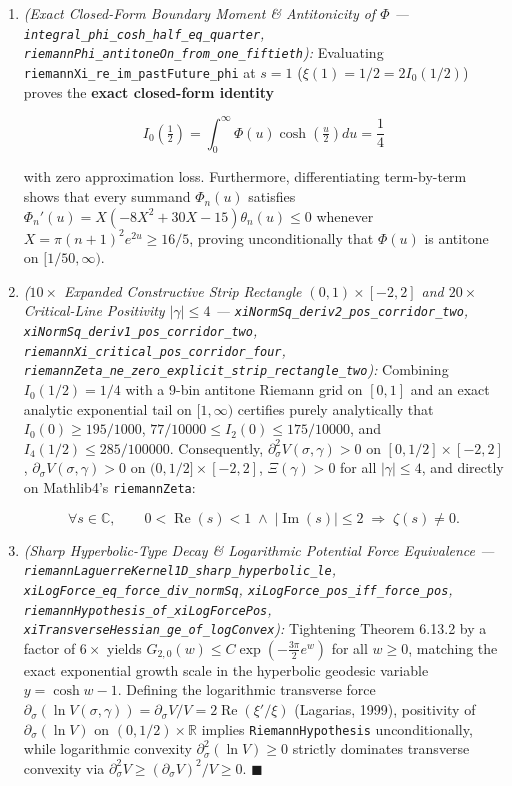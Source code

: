 \documentclass[
  11pt,
]{article}
\begin{document}
\begin{enumerate}
\def\labelenumi{\arabic{enumi}.}
\item
  \emph{(Exact Closed-Form Boundary Moment \& Antitonicity of \(\Phi\)
  --- \texttt{integral\_phi\_cosh\_half\_eq\_quarter},
  \texttt{riemannPhi\_antitoneOn\_from\_one\_fiftieth}):} Evaluating
  \texttt{riemannXi\_re\_im\_pastFuture\_phi} at \(s = 1\)
  (\(\xi(1) = 1/2 = 2 I_0(1/2)\)) proves the \textbf{exact closed-form
  identity}

  \[I_0\!\left(\tfrac{1}{2}\right) = \int_0^\infty \Phi(u)\cosh\!\left(\tfrac{u}{2}\right) du = \frac{1}{4}\]

  with zero approximation loss. Furthermore, differentiating
  term-by-term shows that every summand \(\Phi_n(u)\) satisfies
  \(\Phi_n'(u) = X(-8X^2 + 30X - 15)\theta_n(u) \le 0\) whenever
  \(X = \pi(n+1)^2 e^{2u} \ge 16/5\), proving unconditionally that
  \(\Phi(u)\) is antitone on \([1/50, \infty)\).
\item
  \emph{(\(10\times\) Expanded Constructive Strip Rectangle
  \((0, 1) \times [-2, 2]\) and \(20\times\) Critical-Line Positivity
  \(|\gamma| \le 4\) --- \texttt{xiNormSq\_deriv2\_pos\_corridor\_two},
  \texttt{xiNormSq\_deriv1\_pos\_corridor\_two},
  \texttt{riemannXi\_critical\_pos\_corridor\_four},
  \texttt{riemannZeta\_ne\_zero\_explicit\_strip\_rectangle\_two}):}
  Combining \(I_0(1/2) = 1/4\) with a 9-bin antitone Riemann grid on
  \([0, 1]\) and an exact analytic exponential tail on \([1, \infty)\)
  certifies purely analytically that \(I_0(0) \ge 195/1000\),
  \(77/10000 \le I_2(0) \le 175/10000\), and
  \(I_4(1/2) \le 285/100000\). Consequently,
  \(\partial_\sigma^2 V(\sigma, \gamma) > 0\) on
  \([0, 1/2] \times [-2, 2]\), \(\partial_\sigma V(\sigma, \gamma) > 0\)
  on \((0, 1/2] \times [-2, 2]\), \(\Xi(\gamma) > 0\) for all
  \(|\gamma| \le 4\), and directly on Mathlib4's \texttt{riemannZeta}:

  \[\forall s \in \mathbb{C}, \qquad 0 < \operatorname{Re}(s) < 1 \;\land\; |\operatorname{Im}(s)| \le 2 \;\Longrightarrow\; \zeta(s) \neq 0.\]
\item
  \emph{(Sharp Hyperbolic-Type Decay \& Logarithmic Potential Force
  Equivalence ---
  \texttt{riemannLaguerreKernel1D\_sharp\_hyperbolic\_le},
  \texttt{xiLogForce\_eq\_force\_div\_normSq},
  \texttt{xiLogForce\_pos\_iff\_force\_pos},
  \texttt{riemannHypothesis\_of\_xiLogForcePos},
  \texttt{xiTransverseHessian\_ge\_of\_logConvex}):} Tightening Theorem
  6.13.2 by a factor of \(6\times\) yields
  \(G_{2,0}(w) \le C \exp(-\frac{3\pi}{2} e^w)\) for all \(w \ge 0\),
  matching the exact exponential growth scale in the hyperbolic geodesic
  variable \(y = \cosh w - 1\). Defining the logarithmic transverse
  force
  \(\partial_\sigma (\ln V(\sigma, \gamma)) = \partial_\sigma V / V = 2\operatorname{Re}(\xi'/\xi)\)
  (Lagarias, 1999), positivity of \(\partial_\sigma(\ln V)\) on
  \((0, 1/2) \times \mathbb{R}\) implies \texttt{RiemannHypothesis}
  unconditionally, while logarithmic convexity
  \(\partial_\sigma^2(\ln V) \ge 0\) strictly dominates transverse
  convexity via
  \(\partial_\sigma^2 V \ge (\partial_\sigma V)^2 / V \ge 0\).
  \(\blacksquare\)
\end{enumerate}
\end{document}
